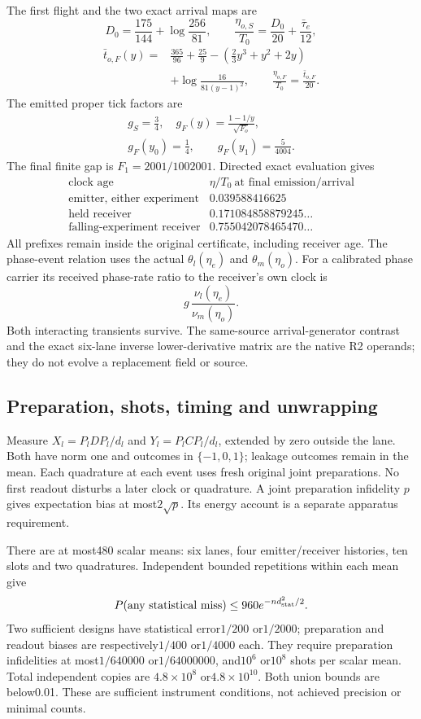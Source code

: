 \documentclass[10pt,twocolumn,letterpaper]{article}
\begin{document}
The first flight and the two exact arrival maps are
\[
 D_0=\frac{175}{144}+\log\frac{256}{81},\qquad
 \frac{\eta_{o,S}}{T_0}=\frac{D_0}{20}+\frac{\bar\tau_e}{12},
\]
\[
 \begin{aligned}
 \bar t_{o,F}(y)={}&\frac{365}{96}+\frac{25}{9}
     -\left(\frac23y^3+y^2+2y\right)\\
   &+\log\frac{16}{81(y-1)^2},\qquad
 \frac{\eta_{o,F}}{T_0}=\frac{\bar t_{o,F}}{20}.
 \end{aligned}
\]
The emitted proper tick factors are
\[
 \begin{gathered}
 g_S=\frac34,\quad g_F(y)=\frac{1-1/y}{\sqrt{F_o}},\\
 g_F(y_0)=\frac14,\qquad g_F(y_1)=\frac5{4004}.
 \end{gathered}
\]
The final finite gap is $F_1=2001/1002001$. Directed exact evaluation gives
\[
 \begin{array}{c|c}
 \text{clock age}&\eta/T_0\ \text{at final emission/arrival}\\\hline
 \text{emitter, either experiment}&0.039588416625\\
 \text{held receiver}&0.171084858879245\ldots\\
 \text{falling-experiment receiver}&0.755042078465470\ldots
 \end{array}
\]
All prefixes remain inside the original certificate, including receiver age.
The phase-event relation uses the actual $\theta_l(\eta_e)$ and
$\theta_m(\eta_o)$. For a calibrated phase carrier its received phase-rate
ratio to the receiver's own clock is
\[
 g\,\frac{\nu_l(\eta_e)}{\nu_m(\eta_o)}.
\]
Both interacting transients survive. The same-source arrival-generator
contrast and the exact six-lane inverse lower-derivative matrix are the
native R2 operands; they do not evolve a replacement field or source.

\subsection{Preparation, shots, timing and unwrapping}
Measure $X_l=P_lDP_l/d_l$ and $Y_l=P_lCP_l/d_l$, extended by zero outside
the lane. Both have norm one and outcomes in $\{-1,0,1\}$; leakage outcomes
remain in the mean. Each quadrature at each event uses fresh original joint
preparations. No first readout disturbs a later clock or quadrature.
A joint preparation infidelity $p$ gives expectation bias at most$2\sqrt p$.
Its energy account is a separate apparatus requirement.

There are at most480 scalar means: six lanes, four emitter/receiver histories,
ten slots and two quadratures. Independent bounded repetitions within each
mean give
\[
 P(\text{any statistical miss})\le960e^{-nd_{\rm stat}^2/2}.
\]
Two sufficient designs have statistical error$1/200$ or$1/2000$;
preparation and readout biases are respectively$1/400$ or$1/4000$ each.
They require preparation infidelities at most$1/640000$ or$1/64000000$,
and$10^6$ or$10^8$ shots per scalar mean. Total independent copies are
$4.8\times10^8$ or$4.8\times10^{10}$. Both union bounds are below0.01.
These are sufficient instrument conditions, not achieved precision or
minimal counts.
\end{document}
